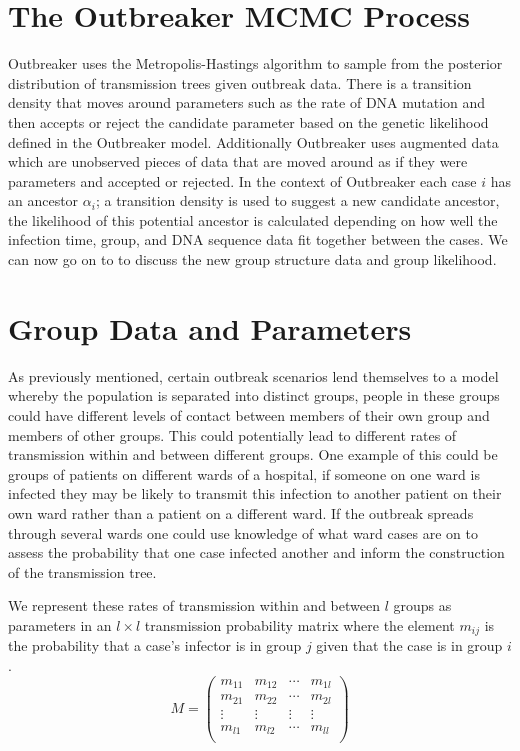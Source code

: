 \documentclass[11pt,a4paper]{report}
\begin{document}
\section{The Outbreaker MCMC Process}
Outbreaker uses the Metropolis-Hastings algorithm to sample from the posterior distribution of transmission trees given outbreak data. There is a transition density that moves around parameters such as the rate of DNA mutation and then accepts or reject the candidate parameter based on the genetic likelihood defined in the Outbreaker model. Additionally Outbreaker uses augmented data which are unobserved pieces of data that are moved around as if they were parameters and accepted or rejected. In the context of Outbreaker each case $i$ has an ancestor $\alpha_i$; a transition density is used to suggest a new candidate ancestor, the likelihood of this potential ancestor is calculated depending on how well the infection time, group, and DNA sequence data fit together between the cases. We can now go on to to discuss the new group structure data and group likelihood.



\section{Group Data and Parameters}
As previously mentioned, certain outbreak scenarios lend themselves to a model whereby the population is separated into distinct groups, people in these groups could have different levels of contact between members of their own group and members of other groups. This could potentially lead to different rates of transmission within and between different groups. One example of this could be groups of patients on different wards of a hospital, if someone on one ward is infected they may be likely to transmit this infection to another patient on their own ward rather than a patient on a different ward. If the outbreak spreads through several wards one could use knowledge of what ward cases are on to assess the probability that one case infected another and inform the construction of the transmission tree.

We represent these rates of transmission within and between $l$ groups as parameters in an $l \times l$ transmission probability matrix where the element $m_{ij}$ is the probability that a case's infector is in group $j$ given that the case is in group $i$.
\[ M = \left( \begin{array}{cccc}
m_{11} & m_{12} & \cdots & m_{1l} \\
m_{21} & m_{22} & \cdots & m_{2l} \\
\vdots & \vdots & \vdots & \vdots \\
m_{l1} & m_{l2} & \cdots & m_{ll} \\
\end{array} \right) \] 
\end{document}
